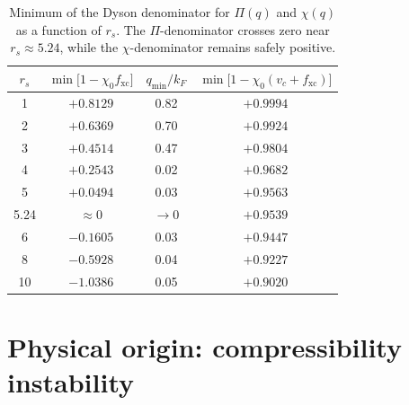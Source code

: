 \documentclass[aps,prb,twocolumn,superscriptaddress,floatfix]{revtex4-2}
\begin{document}
\begin{table}[h]
    \centering
    \caption{Minimum of the Dyson denominator for $\Pi(q)$ and $\chi(q)$
        as a function of $r_s$.  The $\Pi$-denominator crosses zero near
        $r_s \approx 5.24$, while the $\chi$-denominator remains safely positive.}
    \label{tab:denom}
    \begin{tabular}{c c c c}
        \toprule
        $r_s$ & $\min\bigl[1 - \chi_0 f_{\mathrm{xc}}\bigr]$ & $q_{\min}/k_F$ & $\min\bigl[1-\chi_0(v_c+f_{\mathrm{xc}})\bigr]$ \\
        \midrule
        1     & $+0.8129$                                    & 0.82           & $+0.9994$                                       \\
        2     & $+0.6369$                                    & 0.70           & $+0.9924$                                       \\
        3     & $+0.4514$                                    & 0.47           & $+0.9804$                                       \\
        4     & $+0.2543$                                    & 0.02           & $+0.9682$                                       \\
        5     & $+0.0494$                                    & 0.03           & $+0.9563$                                       \\
        5.24  & $\approx 0$                                  & $\to 0$        & $+0.9539$                                       \\
        6     & $-0.1605$                                    & 0.03           & $+0.9447$                                       \\
        8     & $-0.5928$                                    & 0.04           & $+0.9227$                                       \\
        10    & $-1.0386$                                    & 0.05           & $+0.9020$                                       \\
        \bottomrule
    \end{tabular}
\end{table}

\section{Physical origin: compressibility instability}
\label{sec:physics}
\end{document}
